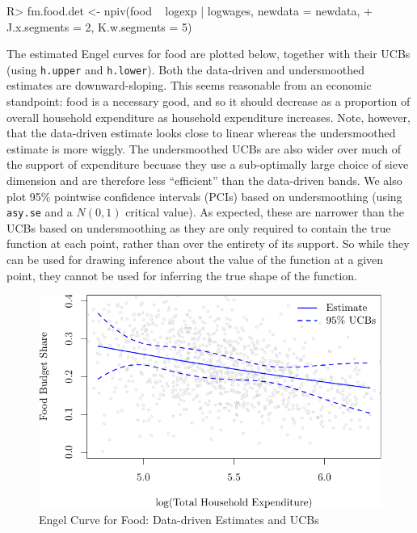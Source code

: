 \documentclass[
]{jss}
\begin{document}
\begin{CodeChunk}
\begin{CodeInput}
R> fm.food.det <- npiv(food ~ logexp | logwages, newdata = newdata, 
+                     J.x.segments = 2, K.w.segments = 5)
\end{CodeInput}
\end{CodeChunk}

The estimated Engel curves for food are plotted below, together with
their UCBs (using \texttt{h.upper} and \texttt{h.lower}). Both the
data-driven and undersmoothed estimates are downward-sloping. This seems
reasonable from an economic standpoint: food is a necessary good, and so
it should decrease as a proportion of overall household expenditure as
household expenditure increases. Note, however, that the data-driven
estimate looks close to linear whereas the undersmoothed estimate is
more wiggly. The undersmoothed UCBs are also wider over much of the
support of expenditure becuase they use a sub-optimally large choice of
sieve dimension and are therefore less ``efficient'' than the
data-driven bands. We also plot 95\% pointwise confidence intervals
(PCIs) based on undersmoothing (using \texttt{asy.se} and a \(N(0,1)\)
critical value). As expected, these are narrower than the UCBs based on
undersmoothing as they are only required to contain the true function at
each point, rather than over the entirety of its support. So while they
can be used for drawing inference about the value of the function at a
given point, they cannot be used for inferring the true shape of the
function.

\begin{figure}
\centering
\includegraphics{npiv_files/figure-latex/food-dd-1.pdf}
\caption{Engel Curve for Food: Data-driven Estimates and UCBs}
\end{figure}
\end{document}
